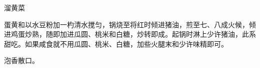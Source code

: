 \begin{recipe}{溜黄菜}

\ingredients


\cooking

蛋黄和以水豆粉加一杓清水搅匀，锅烧至将红时倾进猪油，煎至七、八成火候，倾进鸡蛋炒熟，随即加进瓜圆、桃米和白糖，炒转即成。起锅时淋上少许猪油，此系甜吃。如果咸食就不用瓜圆、桃米、白糖，加些火腿末和少许味精即可。

\notes

泡香散口。

\end{recipe}

